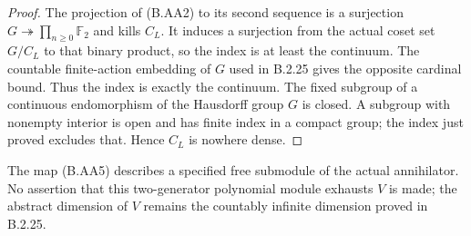 \begin{proof}
The projection of (B.AA2) to its second sequence
is a surjection $G\twoheadrightarrow\prod_{n\geq0}\mathbb F_2$
and kills $C_L$.  It induces a surjection from
the actual coset set $G/C_L$ to that binary
product, so the index is at least the continuum.
The countable finite-action embedding of $G$
used in B.2.25 gives the opposite cardinal bound.
Thus the index is exactly the continuum.
The fixed subgroup of a continuous endomorphism
of the Hausdorff group $G$ is closed.
A subgroup with nonempty interior is open and
has finite index in a compact group; the index
just proved excludes that.  Hence $C_L$ is
nowhere dense.
\end{proof}

The map (B.AA5) describes a specified free submodule
of the actual annihilator.  No assertion that this
two-generator polynomial module exhausts $V$ is
made; the abstract dimension of $V$ remains the
countably infinite dimension proved in B.2.25.

